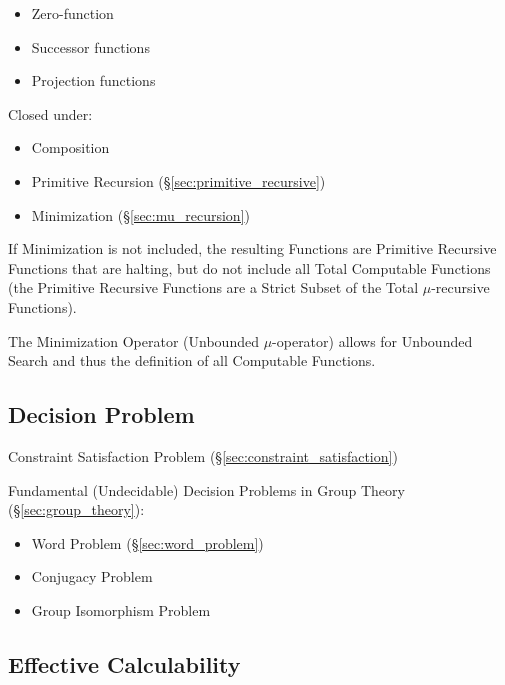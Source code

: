 \begin{itemize}
\item Zero-function
\item Successor functions
\item Projection functions
\end{itemize}

Closed under:

\begin{itemize}
\item Composition
\item Primitive Recursion (\S\ref{sec:primitive_recursive})
\item Minimization (\S\ref{sec:mu_recursion})
\end{itemize}

If Minimization is not included, the resulting Functions are Primitive
Recursive Functions that are halting, but do not include all Total
Computable Functions (the Primitive Recursive Functions are a Strict
Subset of the Total $\mu$-recursive Functions).

The Minimization Operator (Unbounded $\mu$-operator) allows for
Unbounded Search and thus the definition of all Computable Functions.



\subsection{Decision Problem}\label{sec:decision_problem}

\fist Constraint Satisfaction Problem
(\S\ref{sec:constraint_satisfaction})

Fundamental (Undecidable) Decision Problems in Group Theory (\S\ref{sec:group_theory}):
\begin{itemize}
  \item Word Problem (\S\ref{sec:word_problem})
  \item Conjugacy Problem
  \item Group Isomorphism Problem
\end{itemize}



\subsection{Effective Calculability}\label{sec:effective_method}

